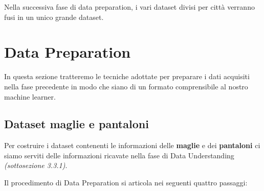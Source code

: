 \documentclass[a4paper, 11pt, oneside]{report}
\begin{document}
            Nella successiva fase di data preparation, i vari dataset divisi per città verranno fusi in un unico grande
            dataset.

            \newpage
            \section{Data Preparation}
            In questa sezione tratteremo le tecniche adottate per preparare i dati acquisiti nella fase precedente in
            modo che siano di un formato comprensibile al nostro machine learner.
                \subsection{Dataset maglie e pantaloni}
                Per costruire i dataset contenenti le informazioni delle \textbf{maglie} e dei \textbf{pantaloni} ci siamo serviti delle
                informazioni ricavate nella fase di Data Understanding \textit{(sottosezione 3.3.1)}.
                \\
                \par \noindent Il procedimento di Data Preparation si articola nei seguenti quattro passaggi:
\end{document}
